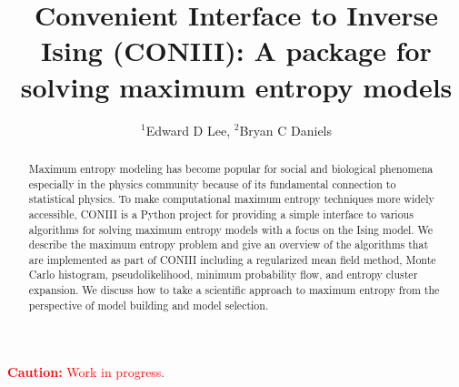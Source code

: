 \documentclass[aps,prl,twocolumn]{revtex4-1}
\begin{document}
\newcommand{\mr}[1]{\mathrm{#1}}
\newcommand{\mb}[1]{\mathbf{#1}}
\newcommand{\br}[1]{\left<#1\right>}
\newcommand{\bl}[1]{\left|#1\right|}
\newcommand{\mc}[1]{\mathcal{#1}}
\newcommand{\tb}[1]{\textcolor{blue}{#1}}
\newcommand{\tr}[1]{\textcolor{red}{#1}}
\newcommand{\tg}[1]{\textcolor{green}{#1}}
\newcommand{\si}[0]{\sigma_{\rm i}}
\newcommand{\sj}[0]{\sigma_{\rm j}}
\newcommand{\bs}[1]{\boldsymbol{#1}}

\title{Convenient Interface to Inverse Ising (CONIII): A package for solving maximum entropy models}
\author{$^1$Edward D Lee, $^2$Bryan C Daniels}

\begin{abstract}
Maximum entropy modeling has become popular for social and biological phenomena especially in the physics community because of its fundamental connection to statistical physics. To make computational maximum entropy techniques more widely accessible, CONIII is a Python project for providing a simple interface to various algorithms for solving maximum entropy models with a focus on the Ising model. We describe the maximum entropy problem and give an overview of the algorithms that are implemented as part of CONIII including a regularized mean field method, Monte Carlo histogram, pseudolikelihood, minimum probability flow, and entropy cluster expansion. We discuss how to take a scientific approach to maximum entropy from the perspective of model building and model selection.
\end{abstract}

\maketitle

\tr{{\bf Caution:} Work in progress.}
\end{document}
